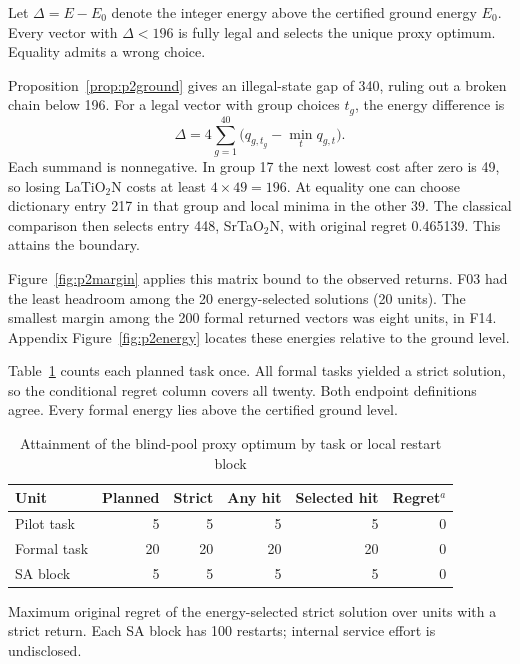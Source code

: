 \begin{proposition}\label{prop:p2margin}
Let $\Delta=E-E_0$ denote the integer energy above the certified ground energy $E_0$. Every vector with $\Delta<196$ is fully legal and selects the unique proxy optimum. Equality admits a wrong choice.
\end{proposition}
\begin{p1proof}
Proposition~\ref{prop:p2ground} gives an illegal-state gap of 340, ruling out a broken chain below 196. For a legal vector with group choices $t_g$, the energy difference is
\begin{equation}
 \Delta=4\sum_{g=1}^{40}\big(q_{g,t_g}-\min_t q_{g,t}\big).
 \label{eq:p2excess}
\end{equation}\nopagebreak[4]
\noindent Each summand is nonnegative. In group 17 the next lowest cost after zero is 49, so losing LaTiO$_2$N costs at least $4\times49=196$. At equality one can choose dictionary entry 217 in that group and local minima in the other 39. The classical comparison then selects entry 448, SrTaO$_2$N, with original regret 0.465139. This attains the boundary.
\end{p1proof}

Figure~\ref{fig:p2margin} applies this matrix bound to the observed returns. F03 had the least headroom among the 20 energy-selected solutions (20 units). The smallest margin among the 200 formal returned vectors was eight units, in F14. Appendix Figure~\ref{fig:p2energy} locates these energies relative to the ground level.

Table~\ref{tab:p2service} counts each planned task once. All formal tasks yielded a strict solution, so the conditional regret column covers all twenty. Both endpoint definitions agree. Every formal energy lies above the certified ground level.
\begin{table}[!htb]
\centering
\caption{Attainment of the blind-pool proxy optimum by task or local restart block}\label{tab:p2service}
\begin{threeparttable}
\begin{tabular}{@{}lrrrrr@{}}
\toprule
Unit & Planned & Strict & Any hit & Selected hit & Regret$^{a}$\\
\midrule
Pilot task & 5 & 5 & 5 & 5 & 0\\
Formal task & 20 & 20 & 20 & 20 & 0\\
SA block & 5 & 5 & 5 & 5 & 0\\
\bottomrule
\end{tabular}
\begin{tablenotes}[flushleft]\footnotesize
\item[$a$] Maximum original regret of the energy-selected strict solution over units with a strict return. Each SA block has 100 restarts; internal service effort is undisclosed.
\end{tablenotes}
\end{threeparttable}
\end{table}
\FloatBarrier

